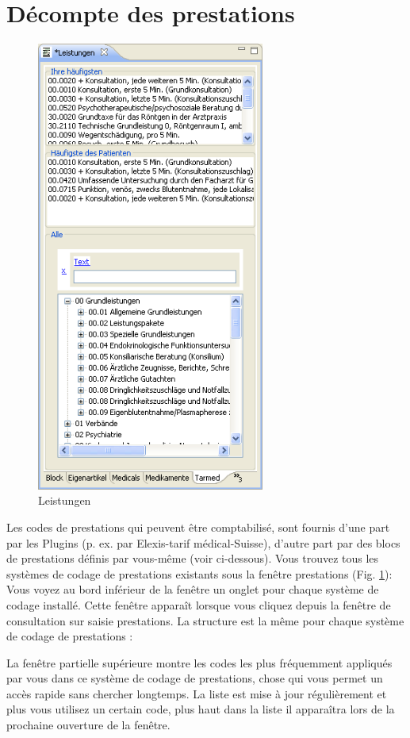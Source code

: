 \section{Décompte des prestations}
\label{concept:leistung}
\begin{figure}
    \includegraphics[width=7.5cm]{images/leistungen1}
    \caption{Leistungen}
    \label{fig:leistungen}
\end{figure}
Les codes de prestations qui peuvent être comptabilisé, sont fournis d'une part par les Plugins (p. ex. par Elexis-tarif médical-Suisse), d'autre part par des blocs de prestations définis par vous-même (voir ci-dessous).
Vous trouvez tous les systèmes de codage de prestations existants sous la fenêtre
\glqq prestations\grqq{} (Fig. \ref{fig:leistungen}): Vous voyez au bord inférieur de la fenêtre un onglet pour chaque système de codage installé. 
Cette fenêtre apparaît lorsque vous cliquez depuis la fenêtre de consultation sur
 \glqq{}saisie prestations\grqq{}. La structure est la même pour chaque système de codage de prestations :

La fenêtre partielle supérieure montre les codes les plus fréquemment appliqués par vous dans ce système de codage de prestations, chose qui vous permet un accès rapide sans chercher longtemps. La liste est mise à jour régulièrement et plus vous utilisez un certain code, plus haut dans la liste il apparaîtra lors de la prochaine ouverture de la fenêtre.


